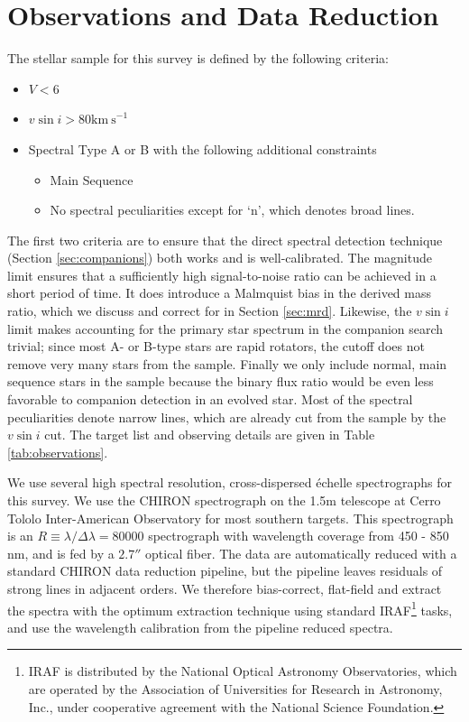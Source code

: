 \documentclass{emulateapj}
\begin{document}
 


\section{Observations and Data Reduction}
\label{sec:obs}

The stellar sample for this survey is defined by the following criteria:

\begin{itemize}
\item $V < 6$
\item $v\sin{i} > 80 \mathrm{km\ s}^{-1}$
\item Spectral Type A or B with the following additional constraints
\begin{itemize}
  \item Main Sequence
  \item No spectral peculiarities except for `n', which denotes broad lines.
\end{itemize}
\end{itemize}

The first two criteria are to ensure that the direct spectral detection technique (Section \ref{sec:companions}) both works and is well-calibrated. The magnitude limit ensures that a sufficiently high signal-to-noise ratio can be achieved in a short period of time. It does introduce a Malmquist bias in the derived mass ratio, which we discuss and correct for in Section \ref{sec:mrd}. Likewise, the $v\sin{i}$ limit makes accounting for the primary star spectrum in the companion search trivial; since most A- or B-type stars are rapid rotators, the cutoff does not remove very many stars from the sample. Finally we only include normal, main sequence stars in the sample because the binary flux ratio would be even less favorable to companion detection in an evolved star. Most of the spectral peculiarities denote narrow lines, which are already cut from the sample by the $v\sin{i}$ cut. The target list and observing details are given in Table \ref{tab:observations}.

We use several high spectral resolution, cross-dispersed \'echelle spectrographs for this survey. We use the CHIRON spectrograph \citep{CHIRON} on the 1.5m telescope at Cerro Tololo Inter-American Observatory for most southern targets. This spectrograph is an $R\equiv \lambda / \Delta \lambda = 80000$ spectrograph with wavelength coverage from 450 - 850 nm, and is fed by a $2.7''$ optical fiber. The data are automatically reduced with a standard CHIRON data reduction pipeline, but the pipeline leaves residuals of strong lines in adjacent orders. We therefore bias-correct, flat-field and extract the spectra with the optimum extraction technique \citep{Horne1986} using standard IRAF\footnote{IRAF is distributed by the National Optical Astronomy Observatories, which are operated by the Association of Universities for Research in Astronomy, Inc., under cooperative agreement with the National Science Foundation.} tasks, and use the wavelength calibration from the pipeline reduced spectra.
\end{document}
